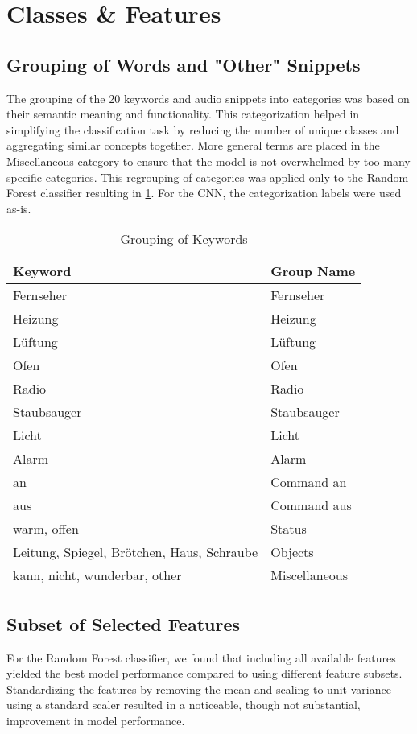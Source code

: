 \section{Classes \& Features}

\subsection{Grouping of Words and "Other" Snippets}
The grouping of the 20 keywords and audio snippets into categories was based on their semantic meaning and functionality. This categorization helped in simplifying the classification task by reducing the number of unique classes and aggregating similar concepts together. More general terms are placed in the Miscellaneous category to ensure that the model is not overwhelmed by too many specific categories. This regrouping of categories was applied only to the Random Forest classifier resulting in \ref{tab:keyword_grouping}. For the CNN, the categorization labels were used as-is.

\begin{table}
  \caption{Grouping of Keywords}
  \label{tab:keyword_grouping}
  \centering
  \begin{tabular}{ll}
    \toprule
    Keyword & Group Name \\
    \midrule
    Fernseher & Fernseher \\
    Heizung & Heizung \\
    Lüftung & Lüftung \\
    Ofen & Ofen \\
    Radio & Radio \\
    Staubsauger & Staubsauger \\
    Licht & Licht \\
    Alarm & Alarm \\
    an & Command an \\
    aus & Command aus \\
    warm, offen & Status \\
    Leitung, Spiegel, Brötchen, Haus, Schraube & Objects \\
    kann, nicht, wunderbar, other & Miscellaneous \\
    \bottomrule
  \end{tabular}
\end{table}

\subsection{Subset of Selected Features}
For the Random Forest classifier, we found that including all available features yielded the best model performance compared to using different feature subsets. Standardizing the features by removing the mean and scaling to unit variance using a standard scaler resulted in a noticeable, though not substantial, improvement in model performance.


